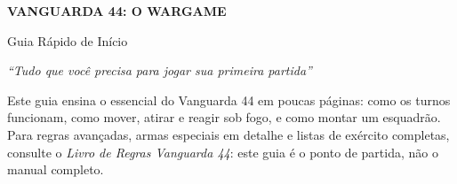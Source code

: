 \documentclass[10pt]{article}
\begin{document}
\begin{center}
{\bfseries\color{vinho}\Huge VANGUARDA 44: O WARGAME\par}
\vspace{6pt}
{\color{mostarda}\Large Guia Rápido de Início\par}
\vspace{8pt}
{\itshape ``Tudo que você precisa para jogar sua primeira partida''\par}
\end{center}

\vspace{18pt}

Este guia ensina o essencial do Vanguarda 44 em poucas páginas: como os turnos funcionam, como mover, atirar e reagir sob fogo, e como montar um esquadrão. Para regras avançadas, armas especiais em detalhe e listas de exército completas, consulte o \textit{Livro de Regras Vanguarda 44}: este guia é o ponto de partida, não o manual completo.
\end{document}
